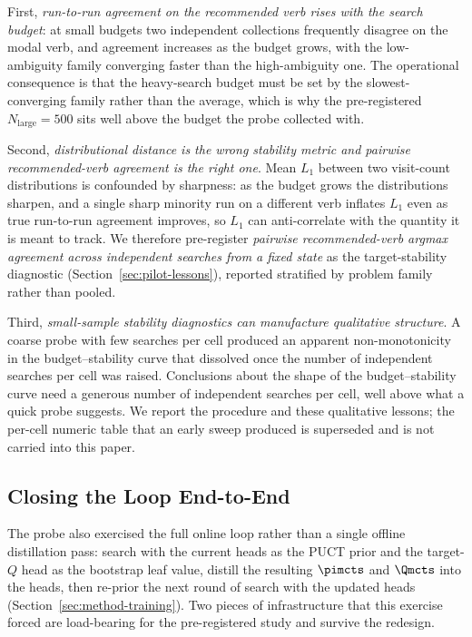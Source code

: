 First, \emph{run-to-run agreement on the recommended verb rises with the search
budget}: at small budgets two independent collections frequently disagree on the
modal verb, and agreement increases as the budget grows, with the low-ambiguity
family converging faster than the high-ambiguity one. The operational
consequence is that the heavy-search budget must be set by the
slowest-converging family rather than the average, which is why the
pre-registered $N_{\mathrm{large}} = 500$ sits well above the budget the probe
collected with.

Second, \emph{distributional distance is the wrong stability metric and pairwise
recommended-verb agreement is the right one}. Mean $L_1$ between two visit-count
distributions is confounded by sharpness: as the budget grows the distributions
sharpen, and a single sharp minority run on a different verb inflates $L_1$ even
as true run-to-run agreement improves, so $L_1$ can anti-correlate with the
quantity it is meant to track. We therefore pre-register \emph{pairwise
recommended-verb argmax agreement across independent searches from a fixed
state} as the target-stability diagnostic (Section~\ref{sec:pilot-lessons}),
reported stratified by problem family rather than pooled.

Third, \emph{small-sample stability diagnostics can manufacture qualitative
structure}. A coarse probe with few searches per cell produced an apparent
non-monotonicity in the budget--stability curve that dissolved once the number
of independent searches per cell was raised. Conclusions about the shape of the
budget--stability curve need a generous number of independent searches per cell,
well above what a quick probe suggests. We report the procedure and these
qualitative lessons; the per-cell numeric table that an early sweep produced is
superseded and is not carried into this paper.

\subsection{Closing the Loop End-to-End}
\label{sec:pilot-closedloop}

The probe also exercised the full online loop rather than a single offline
distillation pass: search with the current heads as the PUCT prior and the
target-$Q$ head as the bootstrap leaf value, distill the resulting $\pimcts$ and
$\Qmcts$ into the heads, then re-prior the next round of search with the updated
heads (Section~\ref{sec:method-training}). Two pieces of infrastructure that
this exercise forced are load-bearing for the pre-registered study and survive
the redesign.

